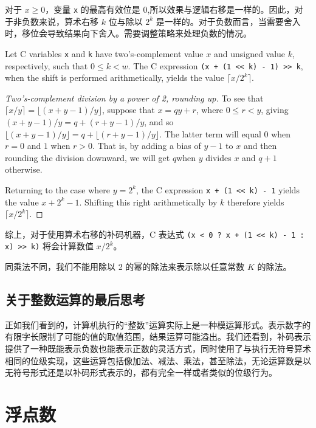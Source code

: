 对于 $x \geq 0$，变量 \verb|x| 的最高有效位是 0,所以效果与逻辑右移是一样的。因此，对于非负数来说，算术右移 $k$ 位与除以 $2^k$ 是一样的。对于负数而言，当需要舍入时，移位会导致结果向下舍入。需要调整策略来处理负数的情况。

\begin{theorem}
    Let C variables \verb|x| and \verb|k| have two’s-complement value $x$ and unsigned value $k$, respectively, such that $0 \leq k < w$. The C expression \verb|(x + (1 << k) - 1) >> k|, when the shift is performed arithmetically, yields the value $\lceil x / 2^k \rceil$.
\end{theorem}

\begin{proof}[Two's-complement division by a power of 2, rounding up]
    To see that $\lceil x / y \rceil = \lfloor (x + y − 1)/y \rfloor$, suppose that $x = qy + r$, where $0 \leq r < y$, giving $(x + y − 1) / y = q + (r + y − 1) / y$, and so $\lfloor (x + y − 1) / y \rfloor = q + \lfloor (r + y − 1) / y \rfloor$. The latter term will equal $0$ when $r = 0$ and $1$ when $r > 0$. That is, by adding a bias of $y − 1$ to $x$ and then rounding the division downward, we will get $q $when $y$ divides $x$ and $q + 1$ otherwise.

    Returning to the case where $y = 2^k$, the C expression \verb|x + (1 << k) - 1| yields the value $x + 2^k − 1$. Shifting this right arithmetically by $k$ therefore yields $\lceil x / 2^k \rceil$.
\end{proof}

综上，对于使用算术右移的补码机器，C 表达式 \verb|(x < 0 ? x + (1 << k) - 1 : x) >> k)| 将会计算数值 $x / 2^k$。

同乘法不同，我们不能用除以 2 的幂的除法来表示除以任意常数 $K$ 的除法。

\subsection{关于整数运算的最后思考}

正如我们看到的，计算机执行的“整数”运算实际上是一种模运算形式。表示数字的有限字长限制了可能的值的取值范围，结果运算可能溢出。我们还看到，补码表示提供了一种既能表示负数也能表示正数的灵活方式，同时使用了与执行无符号算术相同的位级实现，这些运算包括像加法、减法、乘法，甚至除法，无论运算数是以无符号形式还是以补码形式表示的，都有完全一样或者类似的位级行为。

\section{浮点数}

